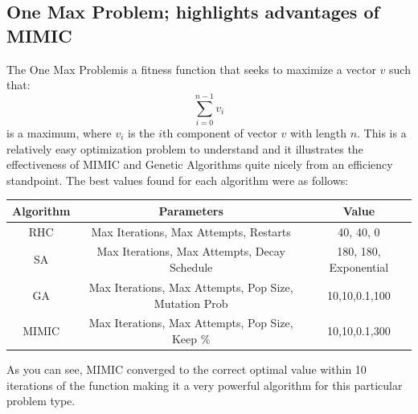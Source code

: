 \documentclass[11pt]{article}
\newcommand{\problemone}{One Max Problem}
\begin{document}
    \subsection{\problemone \hspace{0em}; highlights advantages of MIMIC}
    The \problemone is a fitness function that seeks to maximize a vector $v$ such that:
    \begin{equation}
        \label{oneMax}
        \sum_{i=0}^{n-1} v_i
    \end{equation}
    is a maximum, where $v_i$ is the $i$th component of vector $v$ with length $n$.
    This is a relatively easy optimization problem to understand and it illustrates the effectiveness of MIMIC and Genetic Algorithms
    quite nicely from an efficiency standpoint.
    The best values found for each algorithm were as follows:
    \linebreak
    \begin{center}
        \begin{tabular}{| c | c | c |}
            \hline
            Algorithm & Parameters                             & Value     \\
            \hline
            \hline
            RHC       & Max Iterations, Max Attempts, Restarts & 40, 40, 0 \\
            \hline
            SA & Max Iterations, Max Attempts, Decay Schedule & 180, 180, Exponential \\
            \hline
            GA & Max Iterations, Max Attempts, Pop Size, Mutation Prob & 10,10,0.1,100 \\
            \hline
            MIMIC & Max Iterations, Max Attempts, Pop Size, Keep \% & 10,10,0.1,300\\
            \hline
        \end{tabular}
    \end{center}
    As you can see, MIMIC converged to the correct optimal value within 10 iterations of the function making it a very
    powerful algorithm for this particular problem type.
    \linebreak
\end{document}
